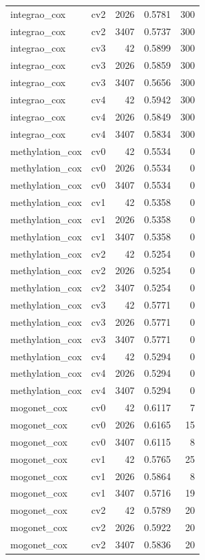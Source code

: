 \documentclass[10pt]{article}
\begin{document}
\begin{longtable}{llrrr}
integrao\_cox & cv2 & 2026 & 0.5781 & 300\\
integrao\_cox & cv2 & 3407 & 0.5737 & 300\\
integrao\_cox & cv3 & 42 & 0.5899 & 300\\
integrao\_cox & cv3 & 2026 & 0.5859 & 300\\
integrao\_cox & cv3 & 3407 & 0.5656 & 300\\
integrao\_cox & cv4 & 42 & 0.5942 & 300\\
integrao\_cox & cv4 & 2026 & 0.5849 & 300\\
integrao\_cox & cv4 & 3407 & 0.5834 & 300\\
methylation\_cox & cv0 & 42 & 0.5534 & 0\\
methylation\_cox & cv0 & 2026 & 0.5534 & 0\\
methylation\_cox & cv0 & 3407 & 0.5534 & 0\\
methylation\_cox & cv1 & 42 & 0.5358 & 0\\
methylation\_cox & cv1 & 2026 & 0.5358 & 0\\
methylation\_cox & cv1 & 3407 & 0.5358 & 0\\
methylation\_cox & cv2 & 42 & 0.5254 & 0\\
methylation\_cox & cv2 & 2026 & 0.5254 & 0\\
methylation\_cox & cv2 & 3407 & 0.5254 & 0\\
methylation\_cox & cv3 & 42 & 0.5771 & 0\\
methylation\_cox & cv3 & 2026 & 0.5771 & 0\\
methylation\_cox & cv3 & 3407 & 0.5771 & 0\\
methylation\_cox & cv4 & 42 & 0.5294 & 0\\
methylation\_cox & cv4 & 2026 & 0.5294 & 0\\
methylation\_cox & cv4 & 3407 & 0.5294 & 0\\
mogonet\_cox & cv0 & 42 & 0.6117 & 7\\
mogonet\_cox & cv0 & 2026 & 0.6165 & 15\\
mogonet\_cox & cv0 & 3407 & 0.6115 & 8\\
mogonet\_cox & cv1 & 42 & 0.5765 & 25\\
mogonet\_cox & cv1 & 2026 & 0.5864 & 8\\
mogonet\_cox & cv1 & 3407 & 0.5716 & 19\\
mogonet\_cox & cv2 & 42 & 0.5789 & 20\\
mogonet\_cox & cv2 & 2026 & 0.5922 & 20\\
mogonet\_cox & cv2 & 3407 & 0.5836 & 20\\

\end{longtable}
\end{document}
